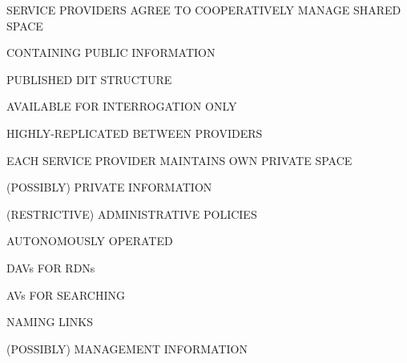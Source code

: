 

\begin{bwslide}

\begin{nrtc}
\item	SERVICE PROVIDERS AGREE TO COOPERATIVELY MANAGE SHARED SPACE
    \begin{nrtc}
    \item	CONTAINING PUBLIC INFORMATION

    \item	PUBLISHED DIT STRUCTURE

    \item	AVAILABLE FOR INTERROGATION ONLY

    \item	HIGHLY-REPLICATED BETWEEN PROVIDERS
    \end{nrtc}

\item	EACH SERVICE PROVIDER MAINTAINS OWN PRIVATE SPACE
    \begin{nrtc}
    \item	(POSSIBLY) PRIVATE INFORMATION

    \item	(RESTRICTIVE) ADMINISTRATIVE POLICIES

    \item	AUTONOMOUSLY OPERATED
    \end{nrtc}
\end{nrtc}
\end{bwslide}


\begin{bwslide}

\begin{nrtc}
\item	DAVs FOR RDNs

\item	AVs FOR SEARCHING

\item	NAMING LINKS

\item	(POSSIBLY) MANAGEMENT INFORMATION
\end{nrtc}
\end{bwslide}


